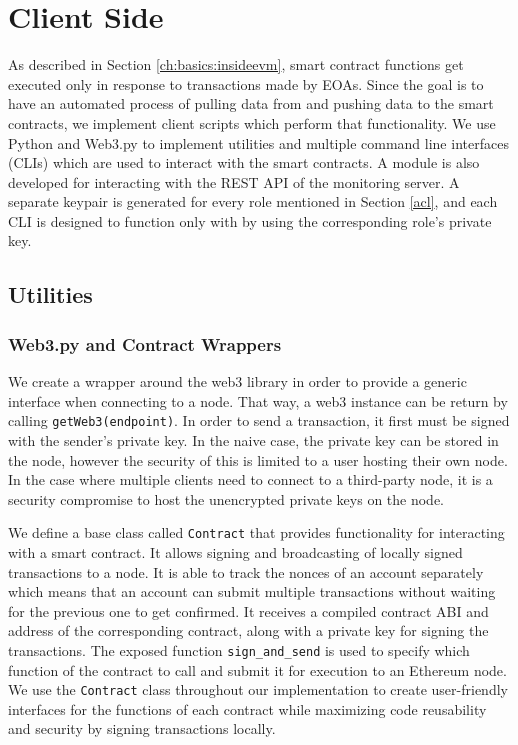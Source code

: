 

\section{Client Side} \label{ch:implementation:client}

As described in Section \ref{ch:basics:insideevm}, smart contract functions get executed only in response to transactions made by EOAs. Since the goal is to have an automated process of pulling data from and pushing data to the smart contracts, we implement client scripts which perform that functionality. We use Python and Web3.py to implement utilities and multiple command line interfaces (CLIs) which are used to interact with the smart contracts. A module is also developed for interacting with the REST API of the monitoring server. A separate keypair is generated for every role mentioned in Section \ref{acl}, and each CLI is designed to function only with by using the corresponding role's private key.


\subsection{Utilities} \label{utils}

\subsubsection*{Web3.py and Contract Wrappers}
We create a wrapper around the web3 library in order to provide a generic interface when connecting to a node. That way, a web3 instance can be return by calling \texttt{getWeb3(endpoint)}. In order to send a transaction, it first must be signed with the sender's private key. In the naive case, the private key can be stored in the node, however the security of this is limited to a user hosting their own node. In the case where multiple clients need to connect to a third-party node, it is a security compromise to host the unencrypted private keys on the node. 

We define a base class called \texttt{Contract} that provides functionality for interacting  with a smart contract. It allows signing and broadcasting of locally signed transactions to a node. It is able to track the nonces of an account separately which means that an account can submit multiple transactions without waiting for the previous one to get confirmed. It receives a compiled contract ABI and address of the corresponding contract, along with a private key for signing the transactions. The exposed function \texttt{sign\_and\_send} is used to specify which function of the contract to call and submit it for execution to an Ethereum node. We use the \texttt{Contract} class throughout our implementation to create user-friendly interfaces for the functions of each contract while maximizing code reusability and security by signing transactions locally.

